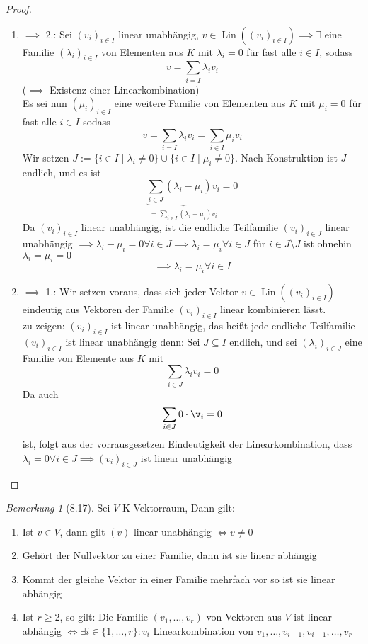 \documentclass[a4paper]{scrartcl}
\DeclareMathOperator{\Exists}{\exists}
\DeclareMathOperator{\Forall}{\forall}
\DeclareMathOperator{\Lin}{Lin}
\theoremstyle{definition}
\theoremstyle{plain}
\theoremstyle{plain}
\theoremstyle{remark}
\newtheorem{remark}{Bemerkung}
\theoremstyle{remark}
\theoremstyle{remark}
\theoremstyle{remark}
\theoremstyle{remark}
\begin{document}
\begin{proof}
\begin{enumerate}
\item $\implies$ 2.: Sei $(v_i)_{i\in I}$ linear unabhängig, $v\in \Lin((v_i)_{i\in I}) \implies \Exists$ eine Familie $(\lambda_i)_{i\in I}$ von Elementen aus $K$ mit
$\lambda_i = 0$ für fast alle $i\in I$, sodass
\[v = \sum_{i=I} \lambda_i v_i\]
($\implies$ Existenz einer Linearkombination) \\
     Es sei nun $(\mu_i)_{i\in I}$ eine weitere Familie von Elementen aus $K$ mit $\mu_i = 0$ für fast alle $i \in I$ sodass
\[v = \sum_{i = I} \lambda_i v_i = \sum_{i\in I} \mu_i v_i\]
Wir setzen $J:= \{i\in I \mid \lambda_i \neq 0\} \cup \{i \in I \mid \mu_i \neq 0\}$. Nach Konstruktion ist $J$ endlich, und es ist
\[\underbrace{\sum_{i\in J} (\lambda_i - \mu_i) v_i}_{=\sum_{i\in I} (\lambda_i - \mu_i) v_i} = 0\]
Da $(v_i)_{i\in I}$ linear unabhängig, ist die endliche Teilfamilie $(v_i)_{i\in J}$ linear unabhängig $\implies \lambda_i - \mu_i = 0 \Forall i\in J \implies \lambda_i = \mu_i \Forall i\in J$
für $i\in J\setminus J$ ist ohnehin $\lambda_i = \mu_i = 0$
\[\implies \lambda_i = \mu_i \Forall i\in I\]
\item $\implies$ 1.: Wir setzen voraus, dass sich jeder Vektor $v\in\Lin((v_i)_{i\in I})$ eindeutig aus Vektoren der Familie $(v_i)_{i\in I}$ linear kombinieren lässt. \\
     zu zeigen: $(v_i)_{i\in I}$ ist linear unabhängig, das heißt jede endliche Teilfamilie $(v_i)_{i\in I}$ ist linear unabhängig denn:
Sei $J \subseteq I$ endlich, und sei $(\lambda_i)_{i\in J}$ eine Familie von Elemente aus $K$ mit
\[\sum_{i\in J}\lambda_i v_i = 0\]
Da auch
\[\sum_{i\in J} 0 \cdot \v_i = 0\]
ist, folgt aus der vorrausgesetzen Eindeutigkeit der Linearkombination, dass $\lambda_i = 0 \Forall i\in J \implies (v_i)_{i\in J}$ ist linear unabhängig
\end{enumerate}
\end{proof}
\begin{remark}[8.17]
Sei $V$ K-Vektorraum, Dann gilt:
\begin{enumerate}
\item Ist $v\in V$, dann gilt $(v)$ linear unabhängig $\iff v \neq 0$
\item Gehört der Nullvektor zu einer Familie, dann ist sie linear abhängig
\item Kommt der gleiche Vektor in einer Familie mehrfach vor so ist sie linear abhängig
\item Ist $r\geq 2$, so gilt: Die Familie $(v_1, \ldots, v_r)$ von Vektoren aus $V$ ist linear abhängig $\iff \Exists i \in \{1, \ldots, r\}: v_i$ Linearkombination von $v_1, \ldots, v_{i - 1}, v_{i + 1}, \ldots, v_r$
\end{enumerate}
\end{remark}
\end{document}
